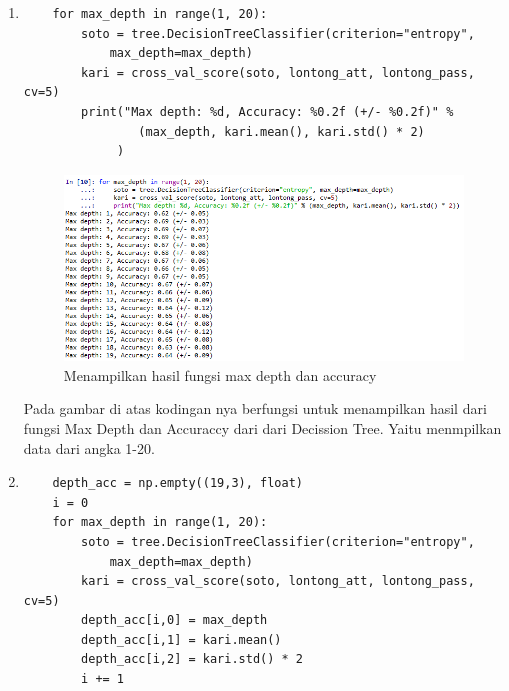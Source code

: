\begin{enumerate}
\item 
\begin{verbatim}
	for max_depth in range(1, 20):
	    soto = tree.DecisionTreeClassifier(criterion="entropy", 
			max_depth=max_depth)
	    kari = cross_val_score(soto, lontong_att, lontong_pass, cv=5)
	    print("Max depth: %d, Accuracy: %0.2f (+/- %0.2f)" % 
				(max_depth, kari.mean(), kari.std() * 2)
			 )
\end{verbatim}
\begin{figure}[ht]
\centering
\includegraphics[scale=0.6]{figures/lontong/10.png}
\caption{Menampilkan hasil fungsi max depth dan accuracy}
\end{figure}
\par
	Pada gambar di atas kodingan nya berfungsi untuk menampilkan hasil dari fungsi Max Depth dan Accuraccy dari dari Decission Tree. Yaitu menmpilkan data dari angka 1-20.

\item
\begin{verbatim}
	depth_acc = np.empty((19,3), float)
	i = 0
	for max_depth in range(1, 20):
	    soto = tree.DecisionTreeClassifier(criterion="entropy", 
			max_depth=max_depth)
	    kari = cross_val_score(soto, lontong_att, lontong_pass, cv=5)
	    depth_acc[i,0] = max_depth
	    depth_acc[i,1] = kari.mean()
	    depth_acc[i,2] = kari.std() * 2
	    i += 1


\end{verbatim}
\end{enumerate}
